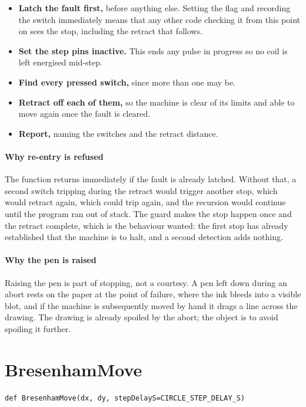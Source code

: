 \begin{itemize}\setlength\itemsep{0pt}
  \item \textbf{Latch the fault first,} before anything else. Setting the flag and recording the switch immediately means that any other code checking it from this point on sees the stop, including the retract that follows.
  \item \textbf{Set the step pins inactive.} This ends any pulse in progress so no coil is left energised mid-step.
  \item \textbf{Find every pressed switch,} since more than one may be.
  \item \textbf{Retract off each of them,} so the machine is clear of its limits and able to move again once the fault is cleared.
  \item \textbf{Report,} naming the switches and the retract distance.
\end{itemize}

\paragraph{Why re-entry is refused}
The function returns immediately if the fault is already latched. Without that, a second switch tripping during the retract would trigger another stop, which would retract again, which could trip again, and the recursion would continue until the program ran out of stack. The guard makes the stop happen once and the retract complete, which is the behaviour wanted: the first stop has already established that the machine is to halt, and a second detection adds nothing.


\paragraph{Why the pen is raised}
Raising the pen is part of stopping, not a courtesy. A pen left down during an abort rests on the paper at the point of failure, where the ink bleeds into a visible blot, and if the machine is subsequently moved by hand it drags a line across the drawing. The drawing is already spoiled by the abort; the object is to avoid spoiling it further.


\section{BresenhamMove}
\begin{lstlisting}[style=sig]
def BresenhamMove(dx, dy, stepDelayS=CIRCLE_STEP_DELAY_S)
\end{lstlisting}

